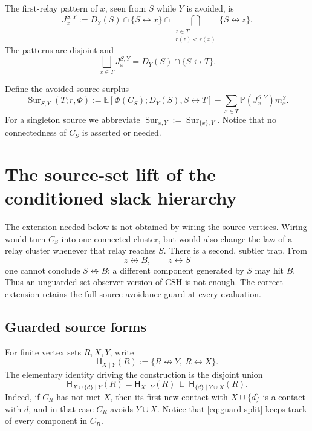 \documentclass[11pt]{article}
\theoremstyle{definition}
\theoremstyle{remark}
\newcommand{\PP}{\mathbb P}
\newcommand{\EE}{\mathbb E}
\newcommand{\Sur}{\operatorname{Sur}}
\newcommand{\con}{\leftrightarrow}
\newcommand{\ncon}{\not\leftrightarrow}
\begin{document}
The first-relay pattern of $x$, seen from $S$ while $Y$ is avoided, is
\begin{equation}\label{eq:pattern}
 J_x^{S,Y}:=D_Y(S)\cap\{S\con x\}
 \cap\bigcap_{\substack{z\in T\\r(z)<r(x)}}\{S\ncon z\}.
\end{equation}
The patterns are disjoint and
\begin{equation}\label{eq:partition}
 \bigsqcup_{x\in T}J_x^{S,Y}
 =D_Y(S)\cap\{S\con T\}.
\end{equation}

Define the avoided source surplus
\begin{equation}\label{eq:surplus}
 \Sur_{S,Y}(T;r,\Phi):=
 \EE[\Phi(C_S);D_Y(S),S\con T]
 -\sum_{x\in T}\PP(J_x^{S,Y})m_x^Y.
\end{equation}
For a singleton source we abbreviate $\Sur_{x,Y}:=\Sur_{\{x\},Y}$.
Notice that no connectedness of $C_S$ is asserted or needed.

\section{The source-set lift of the conditioned slack hierarchy}
\label{sec:sourceset}


The extension needed below is not obtained by wiring the source vertices.
Wiring would turn $C_S$ into one connected cluster, but would also change
the law of a relay cluster whenever that relay reaches $S$.  There is a
second, subtler trap.  From
\[
 z\ncon B,\qquad z\con S
\]
one cannot conclude $S\ncon B$: a different component generated by $S$
may hit $B$.  Thus an unguarded set-observer version of CSH is not enough.
The correct extension retains the full source-avoidance guard at every
evaluation.

\subsection{Guarded source forms}

For finite vertex sets $R,X,Y$, write
\begin{equation}\label{eq:guard-event}
 \mathsf H_{X\mid Y}(R):=\{R\ncon Y,\ R\con X\}.
\end{equation}
The elementary identity driving the construction is the disjoint union
\begin{equation}\label{eq:guard-split}
 \mathsf H_{X\cup\{d\}\mid Y}(R)
 =\mathsf H_{X\mid Y}(R)\ \sqcup\
   \mathsf H_{\{d\}\mid Y\cup X}(R).
\end{equation}
Indeed, if $C_R$ has not met $X$, then its first new contact with
$X\cup\{d\}$ is a contact with $d$, and in that case $C_R$ avoids
$Y\cup X$.  Notice that \eqref{eq:guard-split} keeps track of every
component in $C_R$.
\end{document}
